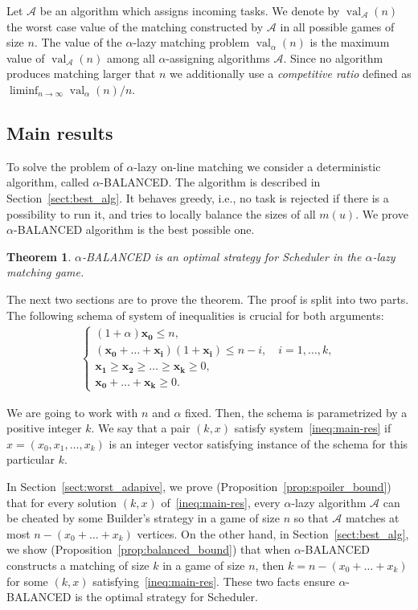 \documentclass[12pt]{amsart}
\renewcommand{\leq}{\leqslant}
\renewcommand{\geq}{\geqslant}
\newtheorem{theorem}{Theorem}[section]
\theoremstyle{definition}
\newcommand{\Alg}[0]{\textsf{BALANCED}\xspace}
\newcommand{\Br}{Builder\xspace}
\newcommand{\Sr}{Scheduler\xspace}
\DeclareMathOperator{\Val}{val}
\newcommand{\vr}[1]{\mathbf{#1}}
\begin{document}
Let $\mathcal{A}$ be an algorithm which assigns incoming tasks. 
We denote by $\Val_{\mathcal{A}}(n)$ the worst case value of the matching constructed by $\mathcal{A}$ in all possible games of size $n$. 
The value of the $\alpha$-lazy matching problem $\Val_\alpha(n)$ is the maximum value of $\Val_{\mathcal{A}}(n)$ among all $\alpha$-assigning algorithms $\mathcal A$. 
Since no algorithm produces matching larger that $n$ we additionally use a \emph{competitive ratio} defined as
$\liminf_{n\to\infty}{\Val_\alpha(n)}/{n}$.
 
 

\subsection{Main results}
To solve the problem of $\alpha$-lazy on-line matching we consider a deterministic algorithm, called $\alpha$-\Alg{}.
The algorithm is described in Section~\ref{sect:best_alg}. 
It behaves greedy, i.e., no task is rejected if there is a possibility to run it, and tries to locally balance the sizes of all $m(u)$.
We prove $\alpha$-\Alg{} algorithm is the best possible one.
\begin{theorem}\label{thm:optimal-bal}
  $\alpha$-\Alg{} is an optimal strategy for \Sr in the $\alpha$-lazy matching game.
\end{theorem}

The next two sections are to prove the theorem.
The proof is split into two parts.
The following schema of system of inequalities is crucial for both arguments:
\begin{align}\label{ineq:main-res}
 \left\{
 \begin{array}{l}
 (1+\alpha)\vr{x_0} \leq n,\\
  (\vr{x_0}+\ldots+\vr{x_i})(1+\vr{x_i})\leq n-i,\quad i=1,\ldots,k,\\
  \vr{x_1} \geq \vr{x_2}\geq \ldots \geq \vr{x_k} \geq 0,\\
  \vr{x_0}+\ldots + \vr{x_k} \geq 0.
 \end{array}
 \right. 
\end{align}


We are going to work with $n$ and $\alpha$ fixed. 
Then, the schema is parametrized by a positive integer $k$.
We say that a pair $(k,x)$ satisfy system~\eqref{ineq:main-res} if $x=(x_0,x_1, \ldots, x_k)$ is an integer vector satisfying instance of the schema for this particular $k$.

In Section~\ref{sect:worst_adapive}, we prove (Proposition~\ref{prop:spoiler_bound}) that for every solution $(k,x)$ of~\eqref{ineq:main-res}, every $\alpha$-lazy algorithm $\mathcal A$ can be cheated by some \Br's strategy in a game of size $n$ so that $\mathcal A$ matches at most $n-(x_0+\ldots+x_k)$ vertices.
On the other hand, in Section~\ref{sect:best_alg}, we show (Proposition~\ref{prop:balanced_bound}) that when $\alpha$-\Alg{} constructs a matching of size $k$ in a game of size $n$, then $k=n-(x_0+\ldots+x_k)$ for some $(k,x)$ satisfying~\eqref{ineq:main-res}.
These two facts ensure $\alpha$-\Alg{} is the optimal strategy for \Sr.
\end{document}
